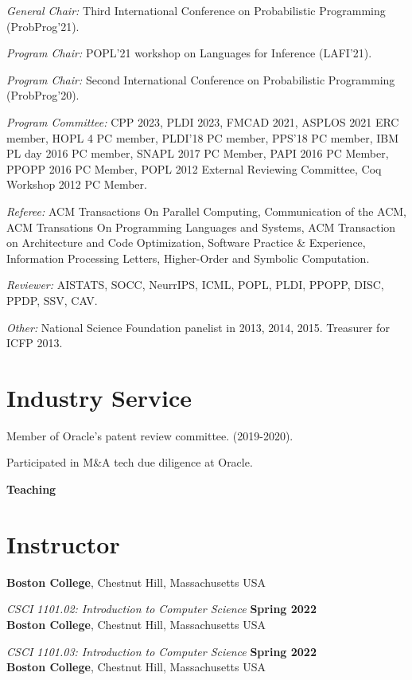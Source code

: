 \documentclass[margin,line]{res}
\begin{document}
\begin{resume}
{\em General Chair:} Third International Conference on Probabilistic Programming (ProbProg'21).

{\em Program Chair:} POPL'21 workshop on Languages for Inference (LAFI'21).

{\em Program Chair:} Second International Conference on Probabilistic Programming (ProbProg'20).

{\em Program Committee:} CPP 2023, PLDI 2023, FMCAD 2021, ASPLOS 2021 ERC member, HOPL 4 PC member,
PLDI'18 PC member, PPS'18 PC member, IBM PL day 2016 PC member, SNAPL
2017 PC Member, PAPI 2016 PC Member, PPOPP 2016 PC Member, POPL 2012
External Reviewing Committee, Coq Workshop 2012 PC Member.

{\em Referee:} ACM Transactions On Parallel Computing, Communication of the ACM, ACM Transations On Programming Languages and Systems, ACM Transaction on Architecture and Code Optimization, 
Software Practice \& Experience, Information Processing Letters, Higher-Order and Symbolic Computation.

{\em Reviewer:} AISTATS, SOCC, NeurrIPS, ICML, POPL, PLDI, PPOPP, DISC, PPDP, SSV,
CAV.

{\em Other:} National Science Foundation panelist in 2013, 2014, 2015. Treasurer for ICFP 2013.

\section{\sc Industry Service}

Member of Oracle's patent review committee. (2019-2020).

Participated in M\&A tech due diligence at Oracle.

\newpage
  {\bf {\Large Teaching}}

\section{\sc Instructor}

{\bf Boston College}, Chestnut Hill, Massachusetts USA
\vspace{-.4cm}

{\em CSCI 1101.02: Introduction  to Computer Science} \hfill {\bf Spring 2022}\\
{\bf Boston College}, Chestnut Hill, Massachusetts USA
\vspace{-.4cm}

{\em CSCI 1101.03: Introduction  to Computer Science} \hfill {\bf Spring 2022}\\
{\bf Boston College}, Chestnut Hill, Massachusetts USA
\vspace{-.4cm}


\end{resume}
\end{document}
